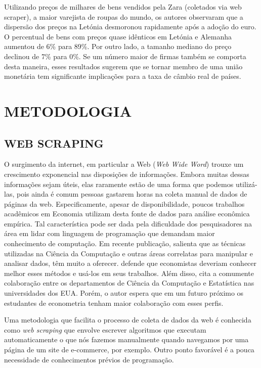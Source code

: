 \documentclass[twoside,a4paper,11pt]{report}
\begin{document}
Utilizando preços de milhares de bens vendidos pela Zara (coletados via web scraper), a maior varejista de roupas do mundo, os autores observaram que a dispersão dos preços na Letónia desmoronou rapidamente após a adoção do euro. O percentual de bens com preços quase idênticos em Letónia e Alemanha aumentou de 6\% para 89\%. Por outro lado, a tamanho mediano do preço declinou de 7\% para 0\%. Se um número maior de firmas também se comporta desta maneira, esses resultados sugerem que se tornar membro de uma união monetária tem significante implicações para a taxa de câmbio real de países. 


\pagestyle{empty}
\cleardoublepage
\pagestyle{fancy}

\chapter{METODOLOGIA}\label{cap3}

\section*{WEB SCRAPING}

O surgimento da internet, em particular a Web (\emph{Web Wide Word}) trouxe um crescimento exponencial nas disposições de informações. Embora muitas dessas informações sejam úteis, elas raramente estão de uma forma que podemos utilizá-las, pois ainda é comum pessoas gastarem horas na coleta manual de dados de páginas da web.
Especificamente, apesar de disponibilidade, poucos trabalhos acadêmicos em Economia utilizam desta fonte de dados para análise econômica empírica. Tal característica pode ser dada pela dificuldade dos pesquisadores na área em lidar com linguagem de programação que demandam maior conhecimento de computação. Em recente publicação, \citet{varian2014big} salienta que as técnicas utilizadas na Ciência da Computação e outras áreas correlatas para manipular e analisar dados, têm muito a oferecer. \citet{varian2014big} defende que economistas deveriam conhecer melhor esses métodos e usá-los em seus trabalhos. Além disso, \citet{varian2014big} cita a comumente colaboração entre os departamentos de Ciência da Computação e Estatística nas universidades dos EUA. Porém, o autor espera que em um futuro próximo os estudantes de econometria tenham maior colaboração com esses perfis. 

Uma metodologia que facilita o processo de coleta de dados da web é conhecida como \emph{web scraping} que envolve escrever algoritmos que executam automaticamente o que nós fazemos manualmente quando navegamos por uma página de um site de e-commerce, por exemplo. Outro ponto favorável é a pouca necessidade de conhecimentos prévios de programação. 
\end{document}
